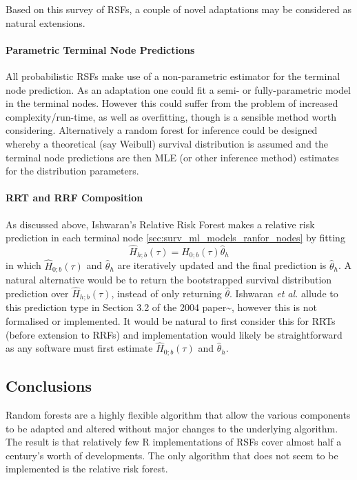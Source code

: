 \documentclass[
  letterpaper,
]{scrbook}
\let\oldparagraph\paragraph
\renewcommand{\paragraph}[1]{\oldparagraph{#1}\mbox{}}
\theoremstyle{plain}
\theoremstyle{definition}
\theoremstyle{remark}
\begin{document}
Based on this survey of RSFs, a couple of novel adaptations may be
considered as natural extensions.

\paragraph{Parametric Terminal Node Predictions}

All probabilistic RSFs make use of a non-parametric estimator for the
terminal node prediction. As an adaptation one could fit a semi- or
fully-parametric model in the terminal nodes. However this could suffer
from the problem of increased complexity/run-time, as well as
overfitting, though is a sensible method worth considering.
Alternatively a random forest for inference could be designed whereby a
theoretical (say Weibull) survival distribution is assumed and the
terminal node predictions are then MLE (or other inference method)
estimates for the distribution parameters.

\paragraph{RRT and RRF Composition}

As discussed above, Ishwaran's Relative Risk Forest makes a relative
risk prediction in each terminal node
\ref{sec:surv_ml_models_ranfor_nodes} by fitting \[
\hat{H}_{h;b}(\tau) = \hat{H}_{0;b}(\tau)\hat{\theta}_h
\] in which \(\hat{H}_{0;b}(\tau)\) and \(\hat{\theta}_h\) are
iteratively updated and the final prediction is \(\hat{\theta}_h\). A
natural alternative would be to return the bootstrapped survival
distribution prediction over \(\hat{H}_{h;b}(\tau)\), instead of only
returning \(\hat{\theta}\). Ishwaran \textit{et al.} allude to this
prediction type in Section 3.2 of the 2004
paper\textasciitilde{}\cite{Ishwaran2004}, however this is not
formalised or implemented. It would be natural to first consider this
for RRTs (before extension to RRFs) and implementation would likely be
straightforward as any software must first estimate
\(\hat{H}_{0;b}(\tau)\) and \(\hat{\theta}_h\).

\subsection{Conclusions}

Random forests are a highly flexible algorithm that allow the various
components to be adapted and altered without major changes to the
underlying algorithm. The result is that relatively few \textsf{R}{}
implementations of RSFs cover almost half a century's worth of
developments. The only algorithm that does not seem to be implemented is
the relative risk forest.
\end{document}
